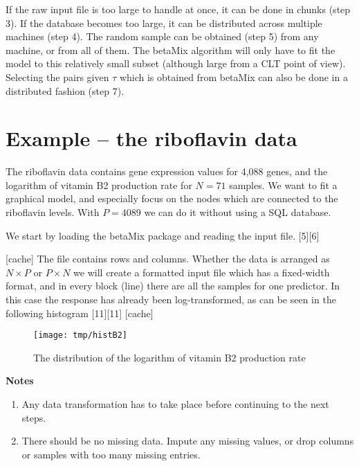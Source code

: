 \documentclass[a4paper,10pt]{article}
\newcommand{\pkg}[1]{{\fontshape{it}\selectfont #1}}
\begin{document}
If the raw input file is too large to handle at once, it can be done in chunks (step 3). If the database becomes too large, it can be distributed across multiple machines (step 4). The random sample can be obtained (step 5) from any machine, or from all of them. The betaMix algorithm will only have to fit the model to this relatively small subset (although large from a CLT point of view). Selecting the pairs given $\tau$ which is obtained from betaMix can also be done in a distributed fashion (step 7).


\section{Example -- the riboflavin data}
The riboflavin data \cite{buhlmann2014} contains gene expression values for 4,088 genes, and the logarithm of vitamin B2 production rate for $N=71$ samples. We want to fit a graphical model, and especially focus on the nodes which are connected to the riboflavin levels. With $P=4089$ we can do it without using a SQL database.

We start by loading the \pkg{betaMix} package and reading the input file.
[5][6]

[cache]
The file contains  rows and  columns.
Whether the data is arranged as $N\times P$ or $P\times N$ we will create a formatted input file which has a fixed-width format, and in every block (line) there are all the samples for one predictor.
In this case the response has already been log-transformed, as can be seen in the following histogram
[11][11]
[cache]
\begin{figure}[htbp]
\begin{center}
\texttt{[image: tmp/histB2]}
\caption{The distribution of the logarithm of vitamin B2 production rate}
\label{histB2}
\end{center}
\end{figure}


\textbf{Notes}
\begin{enumerate}
\item Any data transformation has to take place before continuing to the next steps.
\item There should be no missing data. Impute any missing values, or drop columns or samples with too many missing entries.
\end{enumerate}
\end{document}
